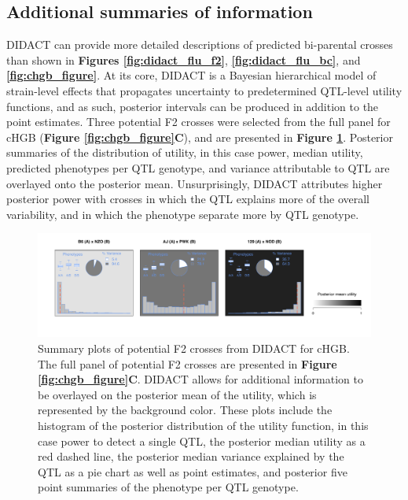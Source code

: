 \subsection{Additional summaries of information}

DIDACT can provide more detailed descriptions of predicted bi-parental crosses than shown in \textbf{Figures \ref{fig:didact_flu_f2}}, \textbf{\ref{fig:didact_flu_bc}}, and \textbf{\ref{fig:chgb_figure}}. At its core, DIDACT is a Bayesian hierarchical model of strain-level effects that propagates uncertainty to predetermined QTL-level utility functions, and as such, posterior intervals can be produced in addition to the point estimates. Three potential F2 crosses were selected from the full panel for cHGB (\textbf{Figure \ref{fig:chgb_figure}C}), and are presented in \textbf{Figure \ref{fig:didact_chgb_detailed}}. Posterior summaries of the distribution of utility, in this case power, median utility, predicted phenotypes per QTL genotype, and variance attributable to QTL are overlayed onto the posterior mean. Unsurprisingly, DIDACT attributes higher posterior power with crosses in which the QTL explains more of the overall variability, and in which the phenotype separate more by QTL genotype.

\begin{figure}
\renewcommand{\familydefault}{\sfdefault}\normalfont
\centering
\includegraphics[width=\textwidth, trim={0.5in 0.5in 0.3in 0.2in}, clip]{figures/2-didact/DIDACT_detailed.pdf}
\caption[Detailed posterior utility visualization]{Summary plots of potential F2 crosses from DIDACT for cHGB. The full panel of potential F2 crosses are presented in \textbf{Figure \ref{fig:chgb_figure}C}. DIDACT allows for additional information to be overlayed on the posterior mean of the utility, which is represented by the background color. These plots include the histogram of the posterior distribution of the utility function, in this case power to detect a single QTL, the posterior median utility as a red dashed line, the posterior median variance explained by the QTL as a pie chart as well as point estimates, and posterior five point summaries of the phenotype per QTL genotype.\label{fig:didact_chgb_detailed}}
\end{figure}

